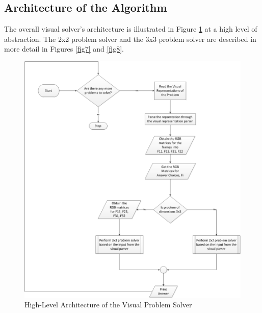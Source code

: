 \documentclass[10pt, letter]{article}
\begin{document}
\subsection*{Architecture of the Algorithm}
The overall visual solver's architecture is illustrated in Figure \ref{fig6} at a high level of abstraction. The 2x2 problem solver and the 3x3 problem solver are described in more detail in Figures \ref{fig7} and \ref{fig8}.

\begin{figure}[h!]
  \centering
    \includegraphics[scale = 0.35]{Images/Fig6}
    \caption{High-Level Architecture of the Visual Problem Solver}
  \label{fig6}
\end{figure}
\end{document}
